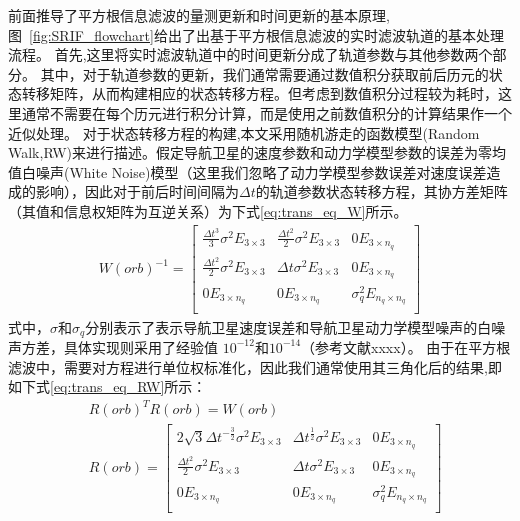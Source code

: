 前面推导了平方根信息滤波的量测更新和时间更新的基本原理,图~\ref{fig:SRIF_flowchart}给出了出基于平方根信息滤波的实时滤波轨道的基本处理流程。
首先,这里将实时滤波轨道中的时间更新分成了轨道参数与其他参数两个部分。
其中，对于轨道参数的更新，我们通常需要通过数值积分获取前后历元的状态转移矩阵，从而构建相应的状态转移方程。但考虑到数值积分过程较为耗时，这里通常不需要在每个历元进行积分计算，而是使用之前数值积分的计算结果作一个近似处理。
对于状态转移方程的构建,本文采用随机游走的函数模型(Random Walk,RW)来进行描述。假定导航卫星的速度参数和动力学模型参数的误差为零均值白噪声(White Noise)模型（这里我们忽略了动力学模型参数误差对速度误差造成的影响），因此对于前后时间间隔为\(\Delta t\)的轨道参数状态转移方程，其协方差矩阵（其值和信息权矩阵为互逆关系）为下式\eqref{eq:trans_eq_W}所示。
\begin{equation}
	\begin{aligned}
		W(orb)^{-1}=
		\begin{bmatrix}
			\frac{\Delta t^{3}}{3}\sigma^{2}E_{3\times3} & 
			\frac{\Delta t^{2}}{2}\sigma^{2}E_{3\times3} &
			0E_{3\times n_{q}} \\
			\frac{\Delta t^{2}}{2}\sigma^{2}E_{3\times3} & 
			\Delta t\sigma^{2}E_{3\times3} &
			0E_{3\times n_{q}} \\
			0E_{3\times n_{q}} &
			0E_{3\times n_{q}} &
			\sigma_{q}^{2}E_{n_{q}\times n_{q}} \\
		\end{bmatrix}
	\end{aligned}	
	\label{eq:trans_eq_W}
\end{equation}
式中，\(\sigma\)和\(\sigma_{q}\)分别表示了表示导航卫星速度误差和导航卫星动力学模型噪声的白噪声方差，具体实现则采用了经验值
\(10^{-12}\)和\(10^{-14}\)（参考文献xxxx）。
由于在平方根滤波中，需要对方程进行单位权标准化，因此我们通常使用其三角化后的结果,即如下式\eqref{eq:trans_eq_RW}所示：
\begin{equation}
	\begin{aligned}
		&R(orb)^{T}R(orb)=W(orb) \\
		& R(orb) =
		\begin{bmatrix}
			2\sqrt{3}\Delta t^{-\frac{3}{2}}\sigma^{2}E_{3\times3} & 
			\Delta t^{\frac{1}{2}}\sigma^{2}E_{3\times3} &
			0E_{3\times n_{q}} \\
			\frac{\Delta t^{2}}{2}\sigma^{2}E_{3\times3} & 
			\Delta t\sigma^{2}E_{3\times3} &
			0E_{3\times n_{q}} \\
			0E_{3\times n_{q}} &
			0E_{3\times n_{q}} &
			\sigma_{q}^{2}E_{n_{q}\times n_{q}} \\
		\end{bmatrix}
	\end{aligned}	
	\label{eq:trans_eq_RW}
\end{equation}


